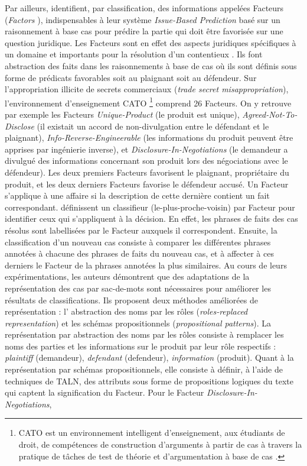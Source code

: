 Par ailleurs,  \citet{Ashley2009classifCases}  identifient, par classification, des informations appelées \og Facteurs \fg{} (\textit{Factors} \citep{ashley1990modeling_factors}),   indispensables à leur système \textit{Issue-Based Prediction} \citep{bruninghaus2003predicting} basé sur un raisonnement à base cas pour prédire la partie qui doit être favorisée sur une question juridique. Les Facteurs sont en effet des aspects juridiques spécifiques à un domaine et importants pour la résolution d'un contentieux \citep{bench1997arguingwithwases_factors}. Ils font abstraction des faits dans les raisonnements à base de cas où ils sont définis sous forme de prédicats favorables soit au plaignant soit au défendeur. Sur l'appropriation illicite de secrets commerciaux  (\textit{trade secret misappropriation}), l'environnement d'enseignement CATO \footnote{CATO est un environnement intelligent d'enseignement, aux étudiants de droit, de compétences de construction d'arguments à partir de cas à travers la pratique de tâches de test de théorie et d'argumentation à base de cas \citep{aleven1997evaluating_CATO}.} \citep{aleven1997evaluating_CATO, aleven2003CATO} comprend 26 Facteurs. On y retrouve par exemple les Facteurs  \textit{Unique-Product} (le produit est unique), \textit{Agreed-Not-To-Disclose} (il existait un accord de non-divulgation entre le défendant et le plaignant), \textit{Info-Reverse-Engineerable} (les informations du produit peuvent être apprises par ingénierie inverse), et \textit{Disclosure-In-Negotiations} (le demandeur a divulgué des informations concernant son produit lors des négociations avec le défendeur). Les deux premiers Facteurs favorisent le plaignant, propriétaire du produit, et les deux derniers Facteurs favorise le défendeur accusé. Un Facteur s'applique à une affaire si la description de cette dernière contient un fait correspondant. \citet{Ashley2009classifCases} définissent un classifieur (le-plus-proche-voisin) par Facteur pour identifier ceux qui s'appliquent à la décision. En effet, les phrases de faits des cas résolus sont labellisées par le Facteur auxquels il correspondent. Ensuite, la classification d'un nouveau cas consiste à comparer les différentes phrases annotées à chacune des phrases de faits du nouveau cas, et à affecter à ces derniers le Facteur de la phrases annotées la plus similaires. Au cours de leurs expérimentations, les auteurs démontrent que des adaptations de la représentation des cas par sac-de-mots sont nécessaires pour améliorer les résultats de classifications. Ils proposent deux méthodes améliorées de représentation \citep{bruninghaus2001improving} : l' \og abstraction des noms par les rôles \fg{} (\textit{roles-replaced representation}) et les \og schémas propositionnels \fg{} (\textit{propositional patterns}). La représentation par abstraction des noms par les rôles consiste à remplacer les noms des parties et les informations sur le produit par leur rôle respectifs : \textit{plaintiff} (demandeur), \textit{defendant} (defendeur), \textit{information} (produit). Quant à la représentation par schémas propositionnels, elle consiste à définir, à l'aide de techniques de TALN, des attributs sous forme de propositions logiques du texte qui captent la signification du Facteur. Pour le Facteur \textit{Disclosure-In-Negotiations}, 
